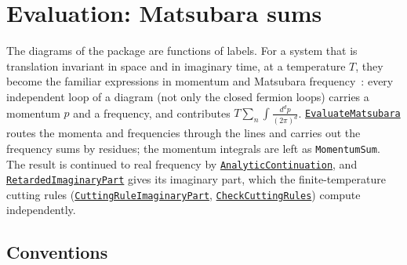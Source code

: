 \documentclass[11pt,a4paper]{article}
\newcommand{\pkg}[1]{\texttt{#1}}
\newcommand{\fnref}[1]{\hyperref[fn:#1]{\pkg{#1}}}
\begin{document}
\section{Evaluation: Matsubara sums}\label{sec:matsubara}

The diagrams of the package are functions of labels. For a system that is translation invariant in space and in imaginary
time, at a temperature $T$, they become the familiar expressions in momentum and Matsubara
frequency~\cite{Matsubara1955,Mahan,BruusFlensberg}: every independent loop of a diagram (not only the closed fermion
loops) carries a momentum $p$ and a frequency, and contributes $T\sum_n\int\!\frac{d^dp}{(2\pi)^d}$.
\fnref{EvaluateMatsubara} routes the momenta and frequencies through the lines and carries out the frequency sums by
residues; the momentum integrals are left as \pkg{MomentumSum}. The result
is continued to real frequency by \fnref{AnalyticContinuation}, and \fnref{RetardedImaginaryPart} gives its imaginary part,
which the finite-temperature cutting rules (\fnref{CuttingRuleImaginaryPart}, \fnref{CheckCuttingRules}) compute
independently.

\subsection{Conventions}\label{sec:matsubara-conventions}
\end{document}
